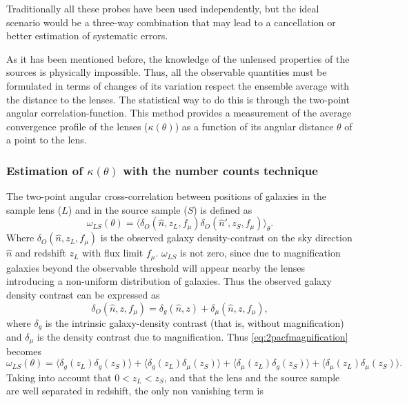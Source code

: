 Traditionally all these probes have been used independently, but the ideal scenario would be a three-way combination that may lead to a cancellation or better estimation of systematic errors.
\newline

As it has been mentioned before, the knowledge of the unlensed properties of the sources is physically impossible. Thus, all the observable quantities must be formulated in terms of changes of its variation respect the ensemble average with the distance to the lenses. The statistical way to do this is through the two-point angular correlation-function. This method provides a measurement of the average convergence profile of the lenses ($\kappa(\theta)$) as a function of its angular distance $\theta$ of a point to the lens.

\subsubsection{Estimation of $\kappa(\theta)$ with the number counts technique}
The two-point angular cross-correlation between positions of galaxies in the sample lens ($L$) and in the source sample ($S$) is defined as \cite{PhysRevD.77.023512,}
\begin{equation}
\omega_{LS}(\theta) = \langle\delta_O(\hat n,z_L,f_\mu)\delta_O(\hat n',z_S,f_\mu)\rangle_{\theta}.
\label{eq:2pacfmagnification}
\end{equation}
Where $\delta_O(\hat n,z_L,f_\mu)$ is the observed galaxy density-contrast on the sky direction $\hat n$ and redshift $z_L$ with flux limit $f_\mu$. $\omega_{LS}$ is not zero, since due to magnification galaxies beyond the observable threshold will appear nearby the lenses introducing a non-uniform distribution of galaxies. Thus the observed galaxy density contrast can be expressed as
\begin{equation}
\delta_O(\hat n,z,f_\mu) = \delta_g(\hat n,z)+\delta_\mu(\hat n,z,f_\mu),
\end{equation}
where $\delta_g$ is the intrinsic galaxy-density contrast (that is, without magnification) and $\delta_\mu$ is the density contrast due to magnification. Thus \autoref{eq:2pacfmagnification} becomes
\begin{equation}
\omega_{LS}(\theta) = \langle\delta_g(z_L)\delta_g(z_S)\rangle+\langle\delta_g(z_L)\delta_\mu(z_S)\rangle+\langle\delta_\mu(z_L)\delta_g(z_S)\rangle+\langle\delta_\mu(z_L)\delta_\mu(z_S)\rangle.
\label{eq:4t}
\end{equation}
Taking into account that $0<z_L<z_S$, and that the lens and the source sample are well separated in redshift, the only non vanishing term is
